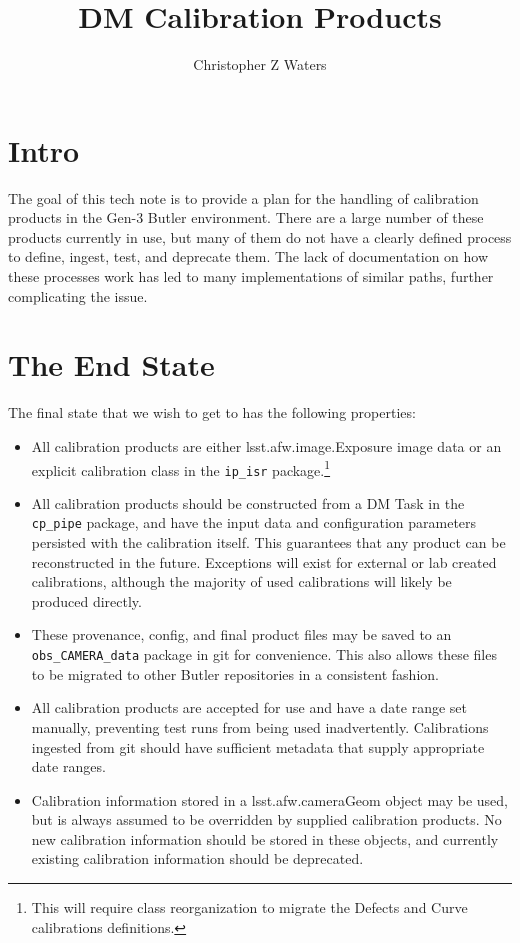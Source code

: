 \documentclass[DM,authoryear,toc]{lsstdoc}
\title{DM Calibration Products}
\author{%
Christopher Z Waters
}
\date{\vcsDate}
\begin{document}
\maketitle


\section{Intro}

The goal of this tech note is to provide a plan for the handling of
calibration products in the Gen-3 Butler environment.  There are a
large number of these products currently in use, but many of them do
not have a clearly defined process to define, ingest, test, and
deprecate them.  The lack of documentation on how these processes work
has led to many implementations of similar paths, further complicating
the issue.


\section{The End State}

The final state that we wish to get to has the following properties:

\begin{itemize}
\item All calibration products are either lsst.afw.image.Exposure
  image data or an explicit calibration class in the \verb|ip_isr|
  package.\footnote{This will require class reorganization to migrate
    the Defects and Curve calibrations definitions.}
\item All calibration products should be constructed from a DM Task in
  the \verb|cp_pipe| package, and have the input data and
  configuration parameters persisted with the calibration itself.
  This guarantees that any product can be reconstructed in the future.
  Exceptions will exist for external or lab created calibrations,
  although the majority of used calibrations will likely be produced
  directly.
\item These provenance, config, and final product files may be saved
  to an \verb|obs_CAMERA_data| package in git for convenience.  This also allows
  these files to be migrated to other Butler repositories in a
  consistent fashion.
\item All calibration products are accepted for use and have a date
  range set manually, preventing test runs from being used
  inadvertently.  Calibrations ingested from git should have sufficient
  metadata that supply appropriate date ranges.
\item Calibration information stored in a lsst.afw.cameraGeom object
  may be used, but is always assumed to be overridden by supplied
  calibration products.  No new calibration information should be
  stored in these objects, and currently existing calibration
  information should be deprecated.

\end{itemize}
\end{document}

